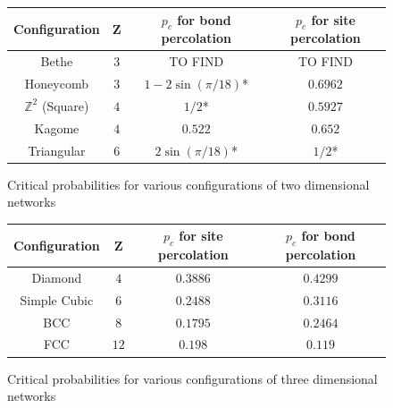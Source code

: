 \begin{figure}[h!]
\begin{center}
\begin{tabular}{| c | c | c | c |}
    \hline
    Configuration & Z & $p_c$ for bond percolation & $p_c$ for site percolation \\
    \hline
    Bethe & $3$ & TO FIND & TO FIND \\
    Honeycomb & $3$ & $1 - 2\sin(\pi/18)$* & $0.6962$ \\
    $\mathbb{Z}^2$ (Square) & $4$ & $1/2$* & $0.5927$ \\
    Kagome & $4$ & $0.522$ & $0.652$ \\
    Triangular & $6$ & $2\sin(\pi/18)$* & $1/2$* \\
    \hline
  \end{tabular}
\end{center}
\centering
\caption{Critical probabilities for various configurations of two dimensional networks}
\label{fig:critical probabilities in two dimensions}
\end{figure}

\begin{figure}[h!]
\begin{center}
\begin{tabular}{| c | c | c | c |}
    \hline
    Configuration & Z & $p_c$ for site percolation & $p_c$ for bond percolation \\
    \hline
    Diamond & $4$ & $0.3886$ & $0.4299$ \\
    Simple Cubic & $6$ & $0.2488$ & $0.3116$ \\
    BCC & $8$ & $0.1795$ & $0.2464$ \\
    FCC & $12$ & $0.198$ & $0.119$ \\
    \hline
  \end{tabular}
\end{center}
\centering
\caption{Critical probabilities for various configurations of three dimensional networks}
\label{fig:critical probabilities in three dimensions}
\end{figure}

